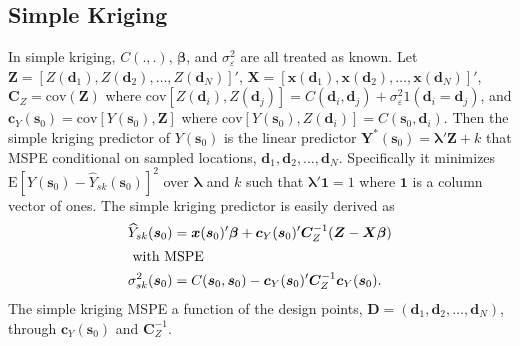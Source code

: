 \documentclass[12pt]{article}
\newcommand{\cov}{\mathrm{cov}}
\newcommand{\E}{\mathrm{E}}
\begin{document}
\subsection{Simple Kriging}
In simple kriging, $C(.,.)$, $\bm{\beta}$, and $\sigma^2_{\varepsilon}$ are all treated as known. Let $\bm{Z} = [Z(\bm{d}_1), Z(\bm{d}_2), \dots, Z(\bm{d}_N) ]'$, $\bm{X} = [\bm{x}(\bm{d}_1), \bm{x}(\bm{d}_2), \dots, \bm{x}(\bm{d}_N)]'$, $\bm{C}_Z = \cov(\bm{Z})$ where $\cov[Z(\bm{d}_i), Z(\bm{d}_j)] = C(\bm{d}_i,\bm{d}_j) + \sigma^2_\varepsilon 1(\bm{d}_i = \bm{d}_j)$, and $\bm{c}_Y(\bm{s}_0) = \cov[Y(\bm{s}_0), \bm{Z}]$ where $\cov[Y(\bm{s}_0), Z(\bm{d}_i)] = C(\bm{s}_0, \bm{d}_i)$. Then the simple kriging predictor of $Y(\bm{s}_0)$ is the linear predictor $\bm{Y}^*(\bm{s}_0) = \bm{\lambda}'\bm{Z} + k$ that MSPE conditional on sampled locations, $\bm{d}_1, \bm{d}_2, \dots, \bm{d}_N$. Specifically it minimizes $\E[Y(\bm{s}_0) - \widehat{Y}_{sk}(\bm{s}_0)]^2$ over $\bm{\lambda}$ and $k$ such that $\bm{\lambda}'\bm{1}=1$ where $\bm{1}$ is a column vector of ones. The simple kriging predictor is easily derived as 
\begin{align*}
\widehat{Y}_{sk}(\bm{s}_0) &= \bm{x}(\bm{s}_0)'\bm{\beta} + \bm{c}_Y(\bm{s}_0)'\bm{C}_Z^{-1}(\bm{Z} - \bm{X}\bm{\beta})\\
\intertext{ with MSPE }
\sigma_{sk}^{2}(\bm{s}_0) &= C(\bm{s}_0,\bm{s}_0) - \bm{c}_Y(\bm{s}_0)'\bm{C}_Z^{-1}\bm{c}_Y(\bm{s}_0).
\end{align*}
The simple kriging MSPE a function of the design points, $\bm{D}=(\bm{d}_1,\bm{d}_2,\dots,\bm{d}_N)$, through $\bm{c}_Y(\bm{s}_0)$ and $\bm{C}_Z^{-1}$. 
\end{document}
